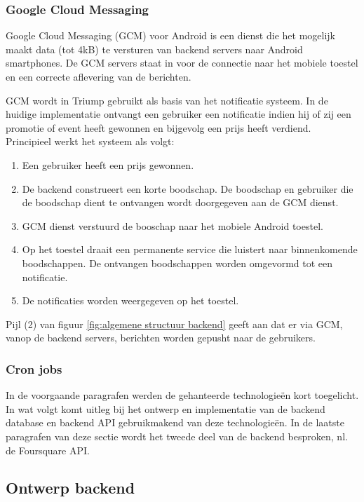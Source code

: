 \subsubsection{Google Cloud Messaging}
Google Cloud Messaging (GCM) voor Android is een dienst die het mogelijk maakt data (tot 4kB) te versturen van backend servers naar Android smartphones. De GCM servers staat in voor de connectie naar het mobiele toestel en een correcte aflevering van de berichten.

GCM wordt in Triump gebruikt als basis van het notificatie systeem. In de huidige implementatie ontvangt een gebruiker een notificatie indien hij of zij een promotie of event heeft gewonnen en bijgevolg een prijs heeft verdiend. Principieel werkt het systeem als volgt:
\begin{enumerate}
  \item Een gebruiker heeft een prijs gewonnen.
  \item De backend construeert een korte boodschap. De boodschap en gebruiker die de boodschap dient te ontvangen wordt doorgegeven aan de GCM dienst. 
  \item GCM dienst verstuurd de booschap naar het mobiele Android toestel.
  \item Op het toestel draait een permanente service die luistert naar binnenkomende boodschappen. De ontvangen boodschappen worden omgevormd tot een notificatie.
  \item De notificaties worden weergegeven op het toestel.
\end{enumerate}
Pijl (2) van figuur \ref{fig:algemene structuur backend} geeft aan dat er via GCM, vanop de backend servers, berichten worden gepusht naar de gebruikers.
\subsubsection{Cron jobs}



In de voorgaande paragrafen werden de gehanteerde technologieën kort toegelicht. In wat volgt komt uitleg bij het ontwerp en implementatie van de backend database en backend API gebruikmakend van deze technologieën. In de laatste paragrafen van deze sectie wordt het tweede deel van de backend besproken, nl. de Foursquare API.
  
\subsection{Ontwerp backend}


